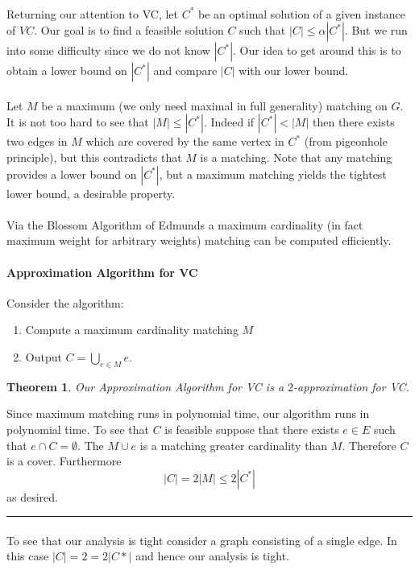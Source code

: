 \documentclass[letterpaper,12pt,oneside,onecolumn]{article}
\newenvironment{proof}{{\bf Proof:  }}{\hfill\rule{2mm}{2mm}}
\newtheorem{theorem}[fact]{Theorem}
\begin{document}
\paragraph{}
Returning our attention to VC, let $C^*$ be an optimal solution of a given instance of $VC$. Our goal is to find a feasible solution $C$ such that $|C| \leq \alpha |C^*|$. But we run into some difficulty since we do not know $|C^*|$. Our idea to get around this is to obtain a lower bound on $|C^*|$ and compare $|C|$ with our lower bound.
\paragraph{}
Let $M$ be a maximum (we only need maximal in full generality) matching on $G$. It is not too hard to see that $|M| \leq |C^*|$. Indeed if $|C^*| < |M|$ then there exists two edges in $M$ which are covered by the same vertex in $C^*$ (from pigeonhole principle), but this contradicts that $M$ is a matching. Note that any matching provides a lower bound on $|C^*|$, but a maximum matching yields the tightest lower bound, a desirable property.
\paragraph{}
Via the Blossom Algorithm of Edmunds a maximum cardinality (in fact maximum weight for arbitrary weights) matching can be computed efficiently.
\paragraph{Approximation Algorithm for VC}
Consider the algorithm:
\begin{enumerate}
\item Compute a maximum cardinality matching $M$
\item Output $C = \bigcup_{e \in M} e$.
\end{enumerate}
\begin{theorem}
Our Approximation Algorithm for VC is a $2$-approximation for VC.
\end{theorem}
\begin{proof}
Since maximum matching runs in polynomial time, our algorithm runs in polynomial time. To see that $C$ is feasible suppose that there exists $e \in E$ such that $e \cap C = \emptyset$. The $M \cup e$ is a matching greater cardinality than $M$. Therefore $C$ is a cover. Furthermore $$|C| = 2|M| \leq 2|C^*|$$ as desired.
\end{proof}
\paragraph{}
To see that our analysis is tight consider a graph consisting of a single edge. In this case $|C| = 2 = 2|C*|$ and hence our analysis is tight.
\end{document}
